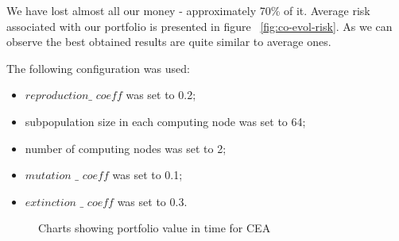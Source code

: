 We have lost almost all our money - approximately 70\% of it.
Average risk associated with our portfolio is presented in figure ~\ref{fig:co-evol-risk}.
As we can observe the best obtained results are quite similar to average ones.

The following configuration was used:
\begin{itemize}
  \item $reproduction\_$ $coeff$ was set to 0.2;
  \item subpopulation size in each computing node was set to 64;
  \item number of computing nodes was set to 2;
  \item $mutation$ $\_$ $coeff$ was set to 0.1;
  \item $extinction$ $\_$ $coeff$ was set to 0.3.
\end{itemize}

\begin{figure}[htb]
  \caption{Charts showing portfolio value in time for CEA}
\label{fig:CEA_2}
\end{figure}



